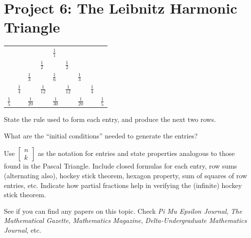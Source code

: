 \documentclass[10pt,]{book}
\theoremstyle{plain}
\theoremstyle{definition}
\theoremstyle{definition}
\theoremstyle{definition}
\theoremstyle{definition}
\numberwithin{equation}{chapter}
\begin{document}
\section[{Project 6: The Leibnitz Harmonic Triangle}]{Project 6: The Leibnitz Harmonic Triangle}\label{exercises-16}
\begin{sidebyside}{1}{0}{0}{0}
\begin{sbspanel}{1}
{\centering%
\begin{tabular}{lllllllll}
&&&&\(\frac{1}{1}\)&&&&\tabularnewline[0pt]
&&&\(\frac{1}{2}\)&&\(\frac{1}{2}\)&&&\tabularnewline[0pt]
&&\(\frac{1}{3}\)&&\(\frac{1}{6}\)&&\(\frac{1}{3}\)&&\tabularnewline[0pt]
&\(\frac{1}{4}\)&&\(\frac{1}{12}\)&&\(\frac{1}{12}\)&&\(\frac{1}{4}\)&\tabularnewline[0pt]
\(\frac{1}{5}\)&&\(\frac{1}{20}\)&&\(\frac{1}{30}\)&&\(\frac{1}{20}\)&&\(\frac{1}{5}\)
\end{tabular}
\par}
\end{sbspanel}
\end{sidebyside}
\begin{divisionexercise}{1}\hypertarget{exercise-167}{}
\hypertarget{p-1228}{}%
State the rule used to form each entry, and produce the next two rows.%
\end{divisionexercise}%
\begin{divisionexercise}{2}\hypertarget{exercise-168}{}
\hypertarget{p-1229}{}%
What are the ``initial conditions'' needed to generate the entries?%
\end{divisionexercise}%
\begin{divisionexercise}{3}\hypertarget{exercise-169}{}
\hypertarget{p-1230}{}%
Use \(\begin{bmatrix} n\\ k \end{bmatrix}\) as the notation for entries and state properties analogous to those found in the Pascal Triangle. Include closed formulas for each entry, row sums (alternating also), hockey stick theorem, hexagon property, sum of squares of row entries, etc. Indicate how partial fractions help in verifying the (infinite) hockey stick theorem.%
\end{divisionexercise}%
\begin{divisionexercise}{4}\hypertarget{exercise-170}{}
\hypertarget{p-1231}{}%
See if you can find any papers on this topic. Check \emph{Pi Mu Epsilon Journal}, \emph{The Mathematical Gazette}, \emph{Mathematics Magazine}, \emph{Delta-Undergraduate Mathematics Journal}, etc.%
\end{divisionexercise}%
\typeout{************************************************}
\typeout{************************************************}
\end{document}
